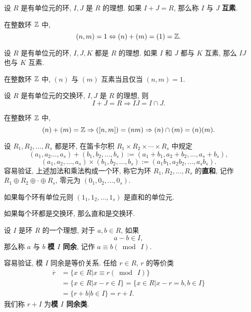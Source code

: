 \begin{definition}\label{理想的互素}
	设 $R$ 是有单位元的环, $I,J$ 是 $R$ 的理想. 如果 $I+J=R$, 那么称 $I$ 与 $J$ \textbf{互素}.
\end{definition}

\begin{example}
在整数环 $\mathbb Z$ 中, $$(n,m)=1 \Leftrightarrow (n)+(m)=(1)=\mathbb Z.$$
\end{example}

\begin{proposition}
	设 $R$ 是有单位元的环, $I,J,K$ 都是 $R$ 的理想. 如果 $I$ 和 $J$ 都与 $K$ 互素, 那么 $IJ$ 也与 $K$ 互素.
\end{proposition}

\begin{example}
在整数环 $\mathbb Z$ 中, $(n)$ 与 $(m)$ 互素当且仅当 $(n,m)=1$.
\end{example}

\begin{proposition}
	设 $R$ 是有单位元的交换环, $I,J$ 是 $R$ 的理想, 则 $$I+J=R\Rightarrow IJ=I\cap J.$$
\end{proposition}

\begin{example}
	在整数环 $\mathbb Z$ 中, $$(n)+(m)=\mathbb Z\Rightarrow ([n,m])=(nm)\Rightarrow (n)\cap (m)=(n)(m).$$
\end{example}

\begin{definition}\label{环的直和}
	设 $R_1,R_2,\ldots,R_s$ 都是环, 在笛卡尔积 $R_1\times R_2\times \cdots\times R_s$ 中规定
	\begin{equation}
		(a_1,a_2\ldots,a_s)+(b_1,b_2,\ldots,b_s):=(a_1+b_1,a_2+b_2,\ldots,a_s+b_s),
	\end{equation}
	\begin{equation}
		(a_1,a_2,\ldots,a_s)\times(b_1,b_2,\ldots,b_s):=(a_1b_1,a_2b_2,\ldots,a_sb_s).
	\end{equation}
	容易验证, 上述加法和乘法构成一个环, 称它为环 $R_1,R_2,\ldots,R_s$ 的\textbf{直和}, 记作 $R_1\oplus R_2\oplus\cdot\oplus R_s$, 零元为 $(0_1,0_2,\ldots,0_s)$.

	如果每个环有单位元则 $(1_1,1_2,\ldots,1_s)$ 是直和的单位元.

	如果每个环都是交换环, 那么直和是交换环.
\end{definition}

\begin{definition}\label{环的同余}

	设 $I$ 是环 $R$ 的一个理想, 对于 $a,b\in R$, 如果 $$a-b\in I,$$ 那么称 $a$ 与 $b$ \textbf{模 $I$ 同余}, 记作 $a\equiv b(\bmod\ I)$.

	容易验证, 模 $I$ 同余是等价关系. 任给 $r\in R$, $r$ 的等价类 $$
	\begin{array}{rl}
		\overline{r} &=\{x\in R|x\equiv r(\bmod\ I)\} \\
			&=\{x\in R|x-r\in I\} = \{x\in R|x-r=b,b\in I\} \\
			&=\{r+b|b\in I\}=r+I.
	\end{array}
	$$
	我们称 $r+I$ 为\textbf{模 $I$ 同余类}.
\end{definition}

